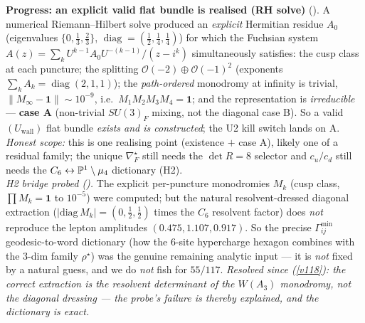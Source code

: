 \par\smallskip\noindent\textbf{Progress: an explicit valid flat bundle is realised (RH solve)} (\mE).
A numerical Riemann--Hilbert solve produced an \emph{explicit} Hermitian residue $A_0$ (eigenvalues
$\{0,\tfrac13,\tfrac23\}$, $\operatorname{diag}=(\tfrac12,\tfrac14,\tfrac14)$) for which the Fuchsian system
$A(z)=\sum_kU^{k-1}A_0U^{-(k-1)}/(z-i^k)$ simultaneously satisfies: the cusp class at each puncture; the
splitting $\mathcal O(-2)\oplus\mathcal O(-1)^2$ (exponents $\sum_kA_k=\operatorname{diag}(2,1,1)$); the
\emph{path-ordered} monodromy at infinity is trivial, $\|M_\infty-\mathbf1\|\sim10^{-9}$, i.e.\
$M_1M_2M_3M_4=\mathbf1$; and the representation is \emph{irreducible} --- \textbf{case A} (non-trivial
$SU(3)_F$ mixing, not the diagonal case B). So a valid $(U_{\mathrm{wall}})$ flat bundle \emph{exists and is
constructed}; the U2 kill switch lands on A. \emph{Honest scope:} this is one realising point (existence
$+$ case A), likely one of a residual family; the unique $\nabla_F^\star$ still needs the $\det R=8$
selector and $c_u/c_d$ still needs the $C_6\leftrightarrow\mathbb P^1\setminus\mu_4$ dictionary (H2).
\veri{v33\_explicit\_flat\_bundle.py}
\smallskip\\
\noindent\emph{H2 bridge probed ().} The explicit per-puncture
monodromies $M_k$ (cusp class, $\prod M_k=\mathbf1$ to $10^{-5}$) were computed; but the natural
resolvent-dressed diagonal extraction ($|\mathrm{diag}\,M_k|=(0,\tfrac12,\tfrac12)$ times the $C_6$
resolvent factor) does \emph{not} reproduce the lepton amplitudes $(0.475,1.107,0.917)$. So the precise
$\Gamma^{\min}_{ij}$ geodesic-to-word dictionary (how the $6$-site hypercharge hexagon combines with the
$3$-dim family $\rho^\star$) was the genuine remaining analytic input --- it is \emph{not} fixed by a
natural guess, and we do \emph{not} fish for $55/117$. \emph{Resolved since (\vref{v118}): the correct
extraction is the resolvent determinant of the $W(A_3)$ monodromy, not the diagonal dressing --- the
probe's failure is thereby explained, and the dictionary is exact.}


